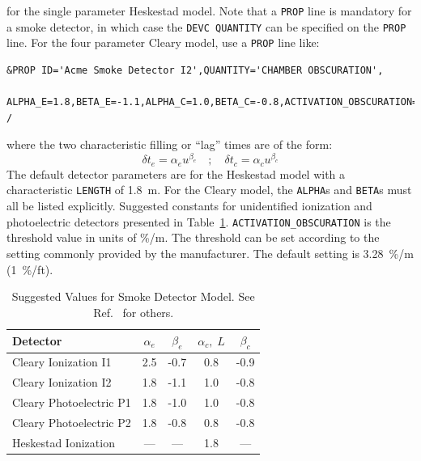 \documentclass[11pt]{book}
\newcommand{\ct}{\tt\small}
\newcommand{\be}{\begin{equation}}
\newcommand{\ee}{\end{equation}}
\begin{document}
\normalsize
\noindent
for the single parameter Heskestad model. Note that a {\ct PROP} line is mandatory for a smoke detector, in which case the
{\ct DEVC QUANTITY} can be specified on the {\ct PROP} line. For the four parameter Cleary model, use a {\ct PROP} line like:

\footnotesize
\begin{verbatim}
&PROP ID='Acme Smoke Detector I2',QUANTITY='CHAMBER OBSCURATION',
      ALPHA_E=1.8,BETA_E=-1.1,ALPHA_C=1.0,BETA_C=-0.8,ACTIVATION_OBSCURATION=3.28 /
\end{verbatim}

\normalsize
\noindent
where the two characteristic filling or ``lag'' times are of the form:
\be \delta t_e = \alpha_e u^{\beta_e} \quad ; \quad \delta t_c = \alpha_c u^{\beta_c} \ee
The default detector parameters are for the Heskestad model with a characteristic {\ct LENGTH} of
1.8~m. For the Cleary model, the {\ct ALPHA}s and {\ct BETA}s must all be listed explicitly.
Suggested constants for unidentified ionization and photoelectric detectors
presented in Table~\ref{tab:sdvalues}.
{\ct ACTIVATION\_OBSCURATION} is the threshold value in units of \%/m.
The threshold can be set according to the setting commonly provided by the manufacturer.
The default setting is 3.28~\%/m (1~\%/ft).

\begin{table}[ht]
\caption[Suggested Values for Smoke Detector Model.]{Suggested Values for Smoke Detector Model. See Ref.~\cite{SFPE} for others.}
\vspace{0.1in}
\label{tab:sdvalues}
\begin{center}
\begin{tabular}{|l||c|c|c|c|}
\hline
Detector                      & $\alpha_e$  &  $\beta_e$   &  $\alpha_c, \; L$   &  $\beta_c$  \\ \hline \hline
Cleary Ionization    I1       & 2.5         & -0.7         &  0.8                &  -0.9      \\ \hline
Cleary Ionization    I2       & 1.8         & -1.1         &  1.0                &  -0.8      \\ \hline
Cleary Photoelectric P1       & 1.8         & -1.0         &  1.0                &  -0.8      \\ \hline
Cleary Photoelectric P2       & 1.8         & -0.8         &  0.8                &  -0.8      \\ \hline
Heskestad Ionization          & ---         & ---          &  1.8                &  ---       \\ \hline\end{tabular}
\end{center}
\end{table}
\end{document}

